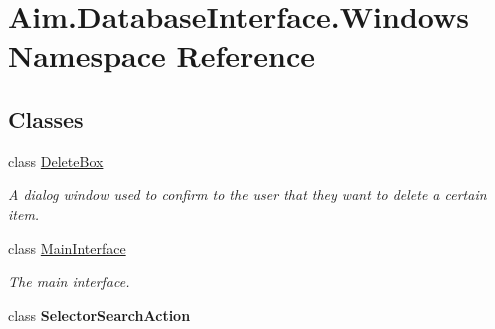 \hypertarget{namespace_aim_1_1_database_interface_1_1_windows}{}\section{Aim.\+Database\+Interface.\+Windows Namespace Reference}
\label{namespace_aim_1_1_database_interface_1_1_windows}
\subsection*{Classes}
\begin{DoxyCompactItemize}
\item 
class \mbox{\hyperlink{class_aim_1_1_database_interface_1_1_windows_1_1_delete_box}{Delete\+Box}}
\begin{DoxyCompactList}\small\item\em A dialog window used to confirm to the user that they want to delete a certain item. \end{DoxyCompactList}\item 
class \mbox{\hyperlink{class_aim_1_1_database_interface_1_1_windows_1_1_main_interface}{Main\+Interface}}
\begin{DoxyCompactList}\small\item\em The main interface. \end{DoxyCompactList}\item 
class {\bfseries Selector\+Search\+Action}
\end{DoxyCompactItemize}
